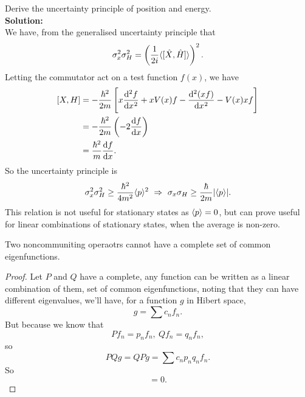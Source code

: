 \begin{wex}
Derive the uncertainty principle of position and energy. \\
\textbf{Solution: }\\
We have, from the generalised uncertainty principle that
\begin{equation}
\sigma_x^2\sigma_H^2=\left(\frac{1}{2i} \langle [\hat{X},\hat{H}]\rangle \right)^2.
\end{equation}
Letting the commutator act on a test function $f(x)$, we have
\begin{subequations}
\begin{align}
[X,H]&=-\frac{\hbar^2}{2m}\lf[x\diff[2]{f}{x}+xV(x)f-\diff[2]{(xf)}{x}-V(x)xf \rt]\\
&=-\frac{\hbar^2}{2m}\lf(-2\diff fx \rt)\\
&=\frac{\hbar^2}{m}\diff fx. \label{xh_commutator}
\end{align}
\end{subequations}
So the uncertainty principle is 
\begin{equation}
\sigma_x^2\sigma_H^2\geq\frac{\hbar^2}{4m^2}\langle p\rangle^2\ \Rightarrow\ \sigma_x\sigma_H\geq\frac{\hbar}{2m}|\langle p\rangle|.
\end{equation}
This relation is not useful for stationary states as $\langle p\rangle=0$, but can prove 
useful for linear combinations of stationary states, when the average is non-zero. 
\end{wex}
\begin{thrm}
Two noncommuniting operaotrs cannot have a complete set of common eigenfunctions. 
\end{thrm}
\begin{proof}
Let $P$ and $Q$ have a complete, \ie any function can be written as a linear 
combination of them, set of common eigenfunctions, 
noting that they can have different eigenvalues, we'll have, 
for a function $g$ in Hibert space, 
\begin{equation}
g=\sum c_nf_n.
\end{equation}
But because we know that
\begin{equation}
Pf_n=p_nf_n,\ Qf_n=q_nf_n,
\end{equation}
so
\begin{equation}
PQg=QPg=\sum c_np_nq_nf_n.
\end{equation}
So 
\begin{equation}
[P,Q]=0.
\end{equation}
\end{proof}

